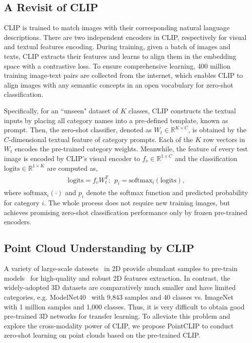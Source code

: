 \documentclass[10pt,twocolumn,letterpaper]{article}
\begin{document}
\vspace*{1pt}
\subsection{A Revisit of CLIP}
\label{reclip}
CLIP is trained to match images with their corresponding natural language descriptions. There are two independent encoders in CLIP, respectively for visual and textual features encoding. During training, given a batch of images and texts, CLIP extracts their features and learns to align them in the embedding space with a contrastive loss. To ensure comprehensive learning, 400 million training image-text pairs are collected from the internet, which enables CLIP to align images with any semantic concepts in an open vocabulary for zero-shot classification.

Specifically, for an ``unseen" dataset of $K$ classes, CLIP constructs the textual inputs by placing all category names into a pre-defined template, known as prompt. Then, the zero-shot classifier, denoted as $W_t \in \mathbb{R}^{K \times C}$, is obtained by the $C$-dimensional textual feature of category prompts. Each of the $K$ row vectors in $W_t$ encodes the pre-trained category weights. Meanwhile, the feature of every test image is encoded by CLIP's visual encoder to $f_v \in \mathbb{R}^{1 \times C}$ and the classification $\mathrm{logits} \in \mathbb{R}^{1 \times K}$ are computed as,
\begin{align}
\label{clip}
\begin{split}
    \mathrm{logits} = f_v W_t^T; \ \ p_i = \mathrm{softmax}_i(\mathrm{logits}),
\end{split}
\end{align}
where $\mathrm{softmax}_i(\cdot)$ and $p_i$ denote the softmax function and predicted probability for category $i$. The whole process does not require new training images, but achieves promising zero-shot classification performance only by frozen pre-trained encoders.

\vspace*{1pt}
\subsection{Point Cloud Understanding by CLIP}
\label{pointclip}

A variety of large-scale datesets~\cite{krizhevsky2012imagenet, lin2014microsoft} in 2D provide abundant samples to pre-train models~\cite{he2016deep, dosovitskiy2020image} for high-quality and robust 2D features extraction. In contrast, the widely-adopted 3D datasets are comparatively much smaller and have limited categories, e.g. ModelNet40~\cite{wu20153d} with 9,843 samples and 40 classes vs. ImageNet~\cite{krizhevsky2012imagenet} with 1 million samples and 1,000 classes.
Thus, it is very difficult to obtain good pre-trained 3D networks for transfer learning. To alleviate this problem and explore the cross-modality power of CLIP, we propose PointCLIP to conduct zero-shot learning on point clouds based on the pre-trained CLIP.
\end{document}
